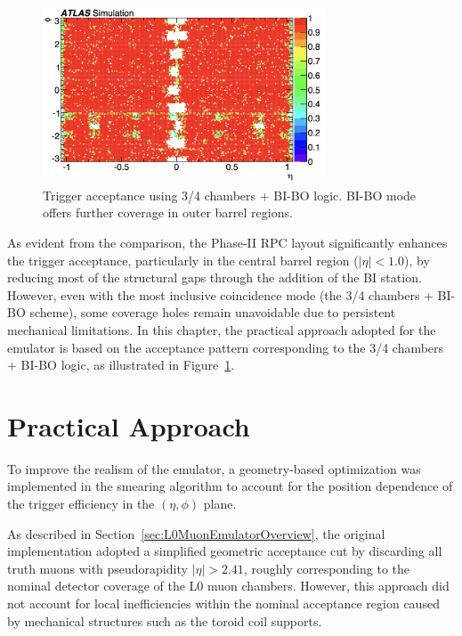\begin{figure}[htbp]
  \centering
  \includegraphics[width=0.75\textwidth]{figs/chapter4/trigger_acceptance_map_3_4_BI_BO.png}
  \caption{Trigger acceptance using 3/4 chambers + BI-BO logic. BI-BO mode offers further coverage in outer barrel regions.}
  \label{fig:trigger_acceptance_3_4_BI_BO}
\end{figure}

As evident from the comparison, the Phase-II RPC layout significantly enhances the trigger acceptance, particularly in the central barrel region ($|\eta| < 1.0$), by reducing most of the structural gaps through the addition of the BI station. However, even with the most inclusive coincidence mode (the 3/4 chambers + BI-BO scheme), some coverage holes remain unavoidable due to persistent mechanical limitations. In this chapter, the practical approach adopted for the emulator is based on the acceptance pattern corresponding to the 3/4 chambers + BI-BO logic, as illustrated in Figure~\ref{fig:trigger_acceptance_3_4_BI_BO}.
\section{Practical Approach} \label{sec:RealismApproach}
To improve the realism of the emulator, a geometry-based optimization was implemented in the smearing algorithm to account for the position dependence of the trigger efficiency in the $(\eta, \phi)$ plane.

As described in Section~\ref{sec:L0MuonEmulatorOverview}, the original implementation adopted a simplified geometric acceptance cut by discarding all truth muons with pseudorapidity $|\eta| > 2.41$, roughly corresponding to the nominal detector coverage of the L0 muon chambers. However, this approach did not account for local inefficiencies within the nominal acceptance region caused by mechanical structures such as the toroid coil supports.


